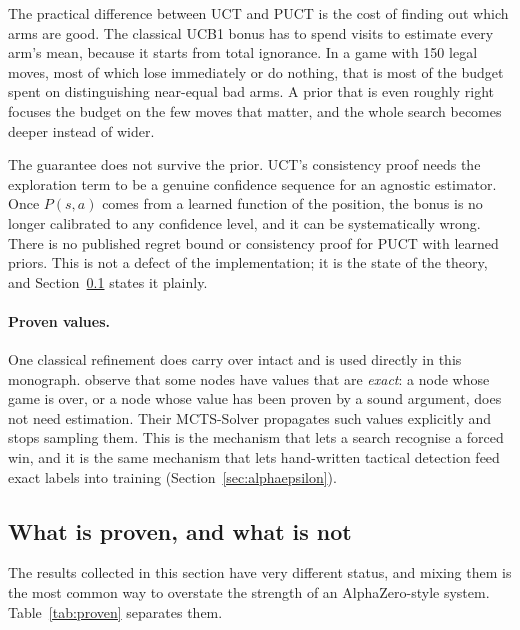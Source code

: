 The practical difference between UCT and PUCT is the cost of finding out which
arms are good. The classical UCB1 bonus has to spend visits to estimate every
arm's mean, because it starts from total ignorance. In a game with 150 legal
moves, most of which lose immediately or do nothing, that is most of the budget
spent on distinguishing near-equal bad arms. A prior that is even roughly right
focuses the budget on the few moves that matter, and the whole search becomes
deeper instead of wider.

\begin{remark}
The guarantee does not survive the prior. UCT's consistency proof needs the
exploration term to be a genuine confidence sequence for an agnostic estimator.
Once $P(s,a)$ comes from a learned function of the position, the bonus is no
longer calibrated to any confidence level, and it can be systematically wrong.
There is no published regret bound or consistency proof for PUCT with learned
priors. This is not a defect of the implementation; it is the state of the
theory, and Section~\ref{sec:proven} states it plainly.
\end{remark}

\paragraph{Proven values.} One classical refinement does carry over intact and is
used directly in this monograph. \citet{winands2008solver} observe that some
nodes have values that are \emph{exact}: a node whose game is over, or a node
whose value has been proven by a sound argument, does not need estimation. Their
MCTS-Solver propagates such values explicitly and stops sampling them. This is
the mechanism that lets a search recognise a forced win, and it is the same
mechanism that lets hand-written tactical detection feed exact labels into
training (Section~\ref{sec:alphaepsilon}).

\subsection{What is proven, and what is not}
\label{sec:proven}

The results collected in this section have very different status, and mixing them
is the most common way to overstate the strength of an AlphaZero-style system.
Table~\ref{tab:proven} separates them.

